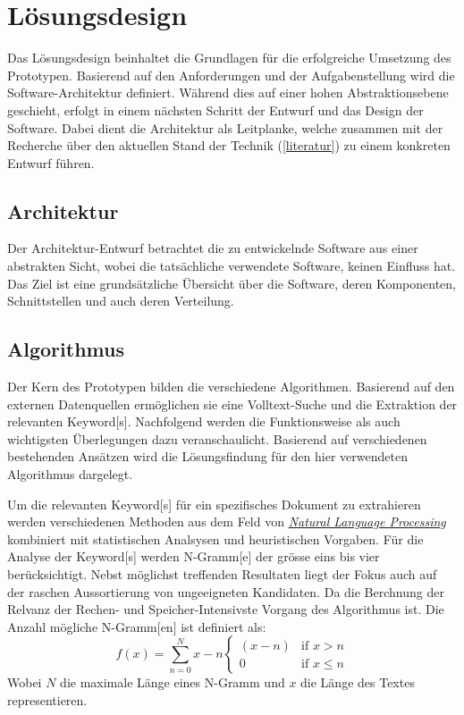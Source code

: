 \chapter{Lösungsdesign}

Das Lösungsdesign beinhaltet die Grundlagen für die erfolgreiche Umsetzung des Prototypen. Basierend auf den Anforderungen und der Aufgabenstellung wird die Software-Architektur definiert. Wäh\-rend dies auf einer hohen Abstraktionsebene geschieht, erfolgt in einem nächsten Schritt der Entwurf und das Design der Software. Dabei dient die Architektur als Leitplanke, welche zusammen mit der Recherche über den aktuellen Stand der Technik (\autoref{literatur}) zu einem konkreten Entwurf führen.

\section{Architektur}\label{architecture}

Der Architektur-Entwurf betrachtet die zu entwickelnde Software aus einer abstrakten Sicht, wobei die tatsächliche verwendete Software, keinen Einfluss hat. Das Ziel ist eine grundsätzliche Übersicht über die Software, deren Komponenten, Schnittstellen und auch deren Verteilung.




\section{Algorithmus}
Der Kern des Prototypen bilden die verschiedene Algorithmen. Basierend auf den externen Datenquellen ermöglichen sie eine Volltext-Suche und die Extraktion der relevanten \gls{Keyword}[s]. Nachfolgend werden die Funktionsweise als auch wichtigsten Überlegungen dazu veranschaulicht. Basierend auf verschiedenen bestehenden Ansätzen wird die Lösungsfindung für den hier verwendeten Algorithmus dargelegt. 


Um die relevanten \gls{Keyword}[s] für ein spezifisches Dokument zu extrahieren werden verschiedenen Methoden aus dem Feld von \hyperref[natural-language-processing]{\textit{Natural Language Processing}} kombiniert mit statistischen Analsysen und heuristischen Vorgaben. Für die Analyse der \gls{Keyword}[s] werden \gls{N-Gramm}[e] der grösse eins bis vier berücksichtigt. Nebst möglichst treffenden Resultaten liegt der Fokus auch auf der raschen Aussortierung von ungeeigneten Kandidaten. Da die Berchnung der Relvanz der Rechen- und Speicher-Intensivste Vorgang des Algorithmus ist.  Die Anzahl mögliche \gls{N-Gramm}[en] ist definiert als: 
\[f(x)=\sum_{n=0}^N x - n  
\begin{cases} 
   (x - n)  & \text{if } x > n \\
   0      & \text{if } x \leq n
  \end{cases}\]
Wobei $N$ die maximale Länge eines \gls{N-Gramm} und $x$ die Länge des Textes representieren.

